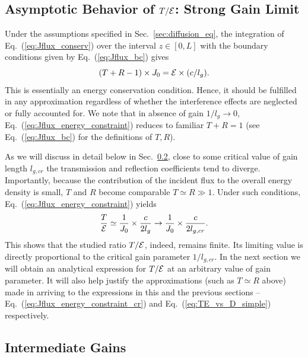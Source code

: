 \subsection{Asymptotic Behavior of \texorpdfstring{$T/{\cal E}$}{T/E}: Strong Gain Limit}
\label{sec:diffusion_cr_gain}

Under the assumptions specified in Sec.~\ref{sec:diffusion_eq}, the integration of Eq.~(\ref{eq:Jflux_conserv}) over the interval $z\in [0,L]$ with the boundary conditions given by Eq.~(\ref{eq:Jflux_bc}) gives
\begin{equation}
(T+R-1)\times J_0={\cal E}\times (c/l_g).
\label{eq:Jflux_energy_constraint}
\end{equation}
This is essentially an energy conservation condition. Hence, it should be fulfilled in any approximation regardless of whether the interference effects are neglected or fully accounted for. We note that in absence of gain $1/l_g\rightarrow 0$, Eq.~(\ref{eq:Jflux_energy_constraint}) reduces to familiar $T+R=1$ (see Eq.~(\ref{eq:Jflux_bc}) for the definitions of $T,R$).

As we will discuss in detail below in Sec.~\ref{sec:diffusion_general}, close to some critical value of gain length $l_{g,cr}$ the transmission and reflection coefficients tend to diverge. Importantly, because the contribution of the incident flux to the overall energy density is small, $T$ and $R$ become comparable $T\simeq R\gg 1$. Under such conditions, Eq.~(\ref{eq:Jflux_energy_constraint}) yields
\begin{equation}
\displaystyle\frac{T}{{\cal E}}\simeq
\displaystyle\frac{1}{J_0} \times
\displaystyle\frac{c}{2l_g}\rightarrow
\displaystyle\frac{1}{J_0} \times
\displaystyle\frac{c}{2l_{g,cr}}.
\label{eq:Jflux_energy_constraint_cr}
\end{equation}
This shows that the studied ratio $T/{\cal E}$, indeed, remains finite. Its limiting value is directly proportional to the critical gain parameter $1/l_{g,cr}$. In the next section we will obtain an analytical expression for $T/{\cal E}$ at an arbitrary value of gain parameter. It will also help justify the approximations (such as $T\simeq R$ above) made in arriving to the expressions in this and the previous sections -- Eq.~(\ref{eq:Jflux_energy_constraint_cr}) and Eq.~(\ref{eq:TE_vs_D_simple}) respectively.

\subsection{Intermediate Gains}
\label{sec:diffusion_general}

